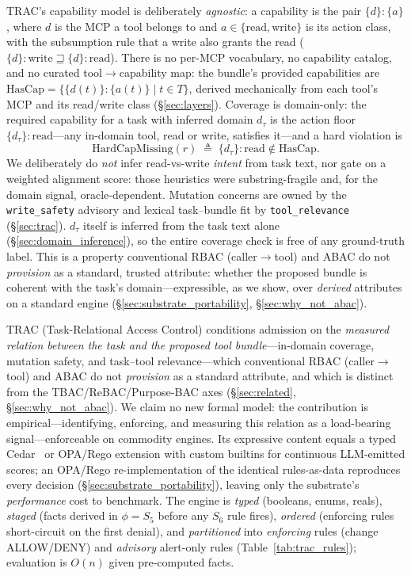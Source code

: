 \documentclass[sigconf,review,anonymous]{acmart}
\begin{document}
TRAC's capability model is deliberately \emph{agnostic}: a capability is the pair $\{d\}{:}\{a\}$, where $d$ is the MCP a tool belongs to and $a\in\{\textrm{read},\textrm{write}\}$ is its action class, with the subsumption rule that a write also grants the read ($\{d\}{:}\textrm{write}\sqsupseteq\{d\}{:}\textrm{read}$). There is no per-MCP vocabulary, no capability catalog, and no curated tool$\to$capability map: the bundle's provided capabilities are $\mathrm{HasCap}=\{\{d(t)\}{:}\{a(t)\}\mid t\in T\}$, derived mechanically from each tool's MCP and its read/write class (\S\ref{sec:layers}). Coverage is domain-only: the required capability for a task with inferred domain $d_\tau$ is the action floor $\{d_\tau\}{:}\textrm{read}$---any in-domain tool, read or write, satisfies it---and a hard violation is
\begin{equation}
\mathrm{HardCapMissing}(r)\;\triangleq\;\{d_\tau\}{:}\textrm{read}\notin\mathrm{HasCap}.
\label{eq:hardcap}
\end{equation}
We deliberately do \emph{not} infer read-vs-write \emph{intent} from task text, nor gate on a weighted alignment score: those heuristics were substring-fragile and, for the domain signal, oracle-dependent. Mutation concerns are owned by the \texttt{write\_safety} advisory and lexical task--bundle fit by \texttt{tool\_relevance} (\S\ref{sec:trac}). $d_\tau$ itself is inferred from the task text alone (\S\ref{sec:domain_inference}), so the entire coverage check is free of any ground-truth label. This is a property conventional RBAC (caller$\to$tool) and ABAC do not \emph{provision} as a standard, trusted attribute: whether the proposed bundle is coherent with the task's domain---expressible, as we show, over \emph{derived} attributes on a standard engine (\S\ref{sec:substrate_portability}, \S\ref{sec:why_not_abac}).

TRAC (Task-Relational Access Control) conditions admission on the \emph{measured relation between the task and the proposed tool bundle}---in-domain coverage, mutation safety, and task--tool relevance---which conventional RBAC (caller$\to$tool) and ABAC do not \emph{provision} as a standard attribute, and which is distinct from the TBAC/ReBAC/Purpose-BAC axes (\S\ref{sec:related}, \S\ref{sec:why_not_abac}). We claim no new formal model: the contribution is empirical---identifying, enforcing, and measuring this relation as a load-bearing signal---enforceable on commodity engines. Its expressive content equals a typed Cedar~\cite{cutler2024cedar} or OPA/Rego extension with custom builtins for continuous LLM-emitted scores; an OPA/Rego re-implementation of the identical rules-as-data reproduces every decision (\S\ref{sec:substrate_portability}), leaving only the substrate's \emph{performance} cost to benchmark. The engine is \emph{typed} (booleans, enums, reals), \emph{staged} (facts derived in $\phi=S_5$ before any $S_6$ rule fires), \emph{ordered} (enforcing rules short-circuit on the first denial), and \emph{partitioned} into \emph{enforcing} rules (change ALLOW/DENY) and \emph{advisory} alert-only rules (Table~\ref{tab:trac_rules}); evaluation is $O(n)$ given pre-computed facts.
\end{document}

